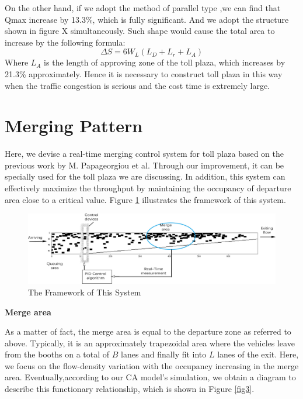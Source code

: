 \documentclass{mcmthesis}
\begin{document}
On the other hand, if we adopt the method
of parallel type ,we can find that Qmax
increase by 13.3\%, which is fully significant.
And we adopt the structure shown in figure X
simultaneously. Such shape would cause the total
area to increase by the following formula:
$$\Delta S=6W_{L}(L_D+L_r+L_A)$$
Where $L_{A}$ is the length of approving zone of
the toll plaza, which increases by 21.3\% approximately. Hence it is necessary to construct
toll plaza in this way when the traffic congestion
is serious and the cost time is extremely large.


\section{Merging Pattern}

Here, we devise a real-time merging control system for
toll plaza based on the previous work by M. Papageorgiou
et al. Through our improvement, it can be specially used
for the toll plaza we are discussing. In addition, this
system can effectively maximize the throughput by
maintaining the occupancy of departure area close to a
critical value. Figure \ref{fig2} illustrates the framework of
this system.

\begin{figure}[h]
\small
\centering
\includegraphics[width=15cm]{figure2}
\caption{The Framework of This System}\label{fig2}
\end{figure}



\textbf{Merge area}

As a matter of fact, the merge area is equal to the
departure zone as referred to above. Typically, it
is an approximately trapezoidal area where the vehicles
leave from the booths on a total of $B$ lanes and finally
fit into $L$ lanes of the exit. Here, we focus on the
flow-density variation with the occupancy increasing
in the merge area. Eventually,according to our CA
model's simulation, we obtain a diagram to
describe this functionary relationship, which is shown
in Figure \ref{fig3}.
\end{document}
